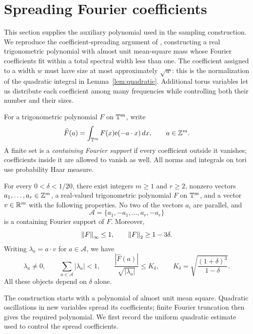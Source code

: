 \section{Spreading Fourier coefficients}
\label{sec:spreading}

This section supplies the auxiliary polynomial used in the sampling
construction.  We reproduce the coefficient-spreading argument of
\cite[Section~4]{OpenAIMinimal}, constructing a real trigonometric
polynomial with almost unit mean-square mass whose Fourier coefficients
fit within a total spectral width less than one.
The coefficient assigned to a width $w$ must have size at
most approximately $\sqrt w$: this is the normalization of the quadratic
integral in Lemma~\ref{lem:quadratic}.  Additional torus variables let us
distribute each coefficient among many frequencies while controlling
both their number and their sizes.

For a trigonometric polynomial $F$ on $\mathbb T^m$, write
\[
 \widehat F(a)=\int_{\mathbb T^m}F(x)\mathrm e(-a\cdot x)\,dx,
 \qquad a\in\mathbb Z^m.
\]
A finite set is a \emph{containing Fourier support} if every coefficient
outside it vanishes; coefficients inside it are allowed to vanish as well.
All norms and integrals on tori use probability Haar measure.

\begin{proposition}
\label{prop:auxiliary}
For every $0<\delta<1/20$, there exist integers $m\ge1$ and $r\ge2$,
nonzero vectors $a_1,\ldots,a_r\in\mathbb Z^m$, a real-valued trigonometric
polynomial $F$ on $\mathbb T^m$, and a vector $v\in\mathbb R^m$ with the following
properties.  No two of the vectors $a_i$ are parallel, and
\[
 \mathcal A=\{a_1,-a_1,\ldots,a_r,-a_r\}
\]
is a containing Fourier support of $F$.  Moreover,
\begin{equation}
 \label{eq:auxiliary-norms}
 \left\lVert F\right\rVert_\infty\le1,
 \qquad \left\lVert F\right\rVert_2\ge1-3\delta.
\end{equation}
Writing $\lambda_a=a\cdot v$ for $a\in\mathcal A$, we have
\begin{equation}
 \label{eq:auxiliary-widths}
 \lambda_a\ne0,
 \qquad \sum_{a\in\mathcal A}|\lambda_a|<1,
 \qquad
 \frac{|\widehat F(a)|}{\sqrt{|\lambda_a|}}
 \le K_\delta,
 \qquad
 K_\delta=\sqrt{\frac{(1+\delta)^3}{1-\delta}}.
\end{equation}
All these objects depend on $\delta$ alone.
\end{proposition}

The construction starts with a polynomial of almost unit mean square.
Quadratic oscillations in new variables spread its coefficients; finite
Fourier truncation then gives the required polynomial.  We first record
the uniform quadratic estimate used to control the spread coefficients.

